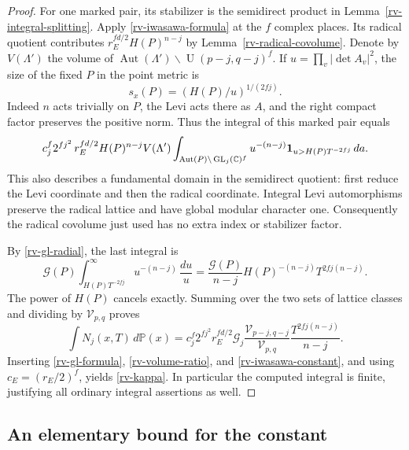 \begin{proof}
For one marked pair, its stabilizer is the semidirect
product in Lemma~\ref{rv-integral-splitting}.  Apply
\eqref{rv-iwasawa-formula} at the $f$ complex places.
Its radical quotient contributes
$r_E^{fd/2}H(P)^{n-j}$ by
Lemma~\ref{rv-radical-covolume}.  Denote by
$V(\Lambda')$ the volume of
$\operatorname{Aut}(\Lambda')\backslash
\operatorname U(p-j,q-j)^f$.
If $u=\prod_v|\det A_v|^2$, the size of the fixed
$P$ in the point metric is
\[
                         s_x(P)=(H(P)/u)^{1/(2fj)}.
\]
Indeed $n$ acts trivially on $P$, the Levi acts there
as $A$, and the right compact factor preserves
the positive norm.  Thus the integral of this
marked pair equals
\[
 \begin{split}
 c_j^f2^{fj^2}\,r_E^{fd/2}H(P)^{n-j}V(\Lambda')
       \int_{\operatorname{Aut}(P)\backslash
                           \operatorname{GL}_j(\mathbb C)^f}
       u^{-(n-j)}
       {\bf1}_{u>H(P)T^{-2fj}}\,da .
 \end{split}
\]
This also describes a fundamental domain in the
semidirect quotient: first reduce the Levi
coordinate and then the radical coordinate.
Integral Levi automorphisms preserve the radical
lattice and have global modular character one.
Consequently the radical covolume just used has no
extra index or stabilizer factor.

By \eqref{rv-gl-radial}, the last integral is
\[
 \mathcal G(P)\int_{H(P)T^{-2fj}}^\infty
                                u^{-(n-j)}\,\frac{du}{u}
  =\frac{\mathcal G(P)}{n-j}
                    H(P)^{-(n-j)}T^{2fj(n-j)}.
\]
The power of $H(P)$ cancels exactly.  Summing over
the two sets of lattice classes and dividing by
$\mathcal V_{p,q}$ proves
\[
 \int N_j(x,T)\,d\mathbb P(x)
 =c_j^f2^{fj^2}r_E^{fd/2}\mathcal G_j
      \frac{\mathcal V_{p-j,q-j}}{\mathcal V_{p,q}}
                  \frac{T^{2fj(n-j)}}{n-j}.
\]
Inserting \eqref{rv-gl-formula},
\eqref{rv-volume-ratio}, and
\eqref{rv-iwasawa-constant}, and using
$c_E=(r_E/2)^f$, yields \eqref{rv-kappa}.
In particular the computed integral is finite,
justifying all ordinary integral assertions as well.
\end{proof}

\subsection{An elementary bound for the constant}

